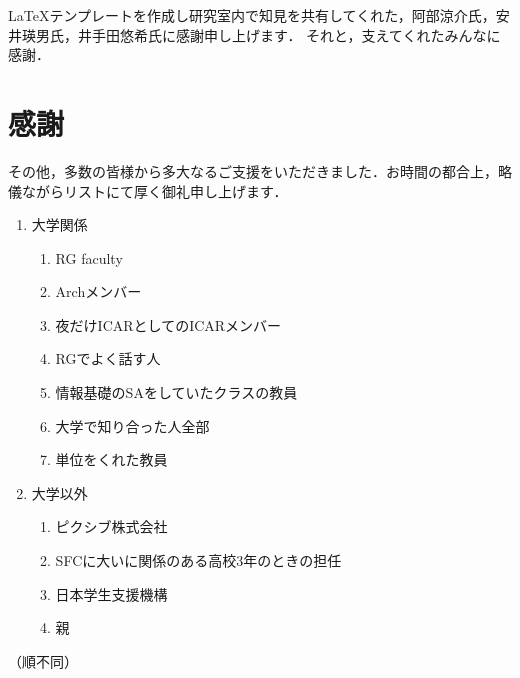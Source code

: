 \begin{acknowledgment}

LaTeXテンプレートを作成し研究室内で知見を共有してくれた，阿部涼介氏，安井瑛男氏，井手田悠希氏に感謝申し上げます．
それと，支えてくれたみんなに感謝．

\section*{感謝}

その他，多数の皆様から多大なるご支援をいただきました．お時間の都合上，略儀ながらリストにて厚く御礼申し上げます．

\begin{enumerate}
  \item 大学関係
  \begin{enumerate}
    \item RG faculty
    \item Archメンバー
    \item 夜だけICARとしてのICARメンバー
    \item RGでよく話す人
    \item 情報基礎のSAをしていたクラスの教員
    \item 大学で知り合った人全部
    \item 単位をくれた教員
  \end{enumerate}

  \item 大学以外
  \begin{enumerate}
    \item ピクシブ株式会社
    \item SFCに大いに関係のある高校3年のときの担任
    \item 日本学生支援機構
    \item 親
  \end{enumerate}
\end{enumerate}

（順不同）

\end{acknowledgment}
